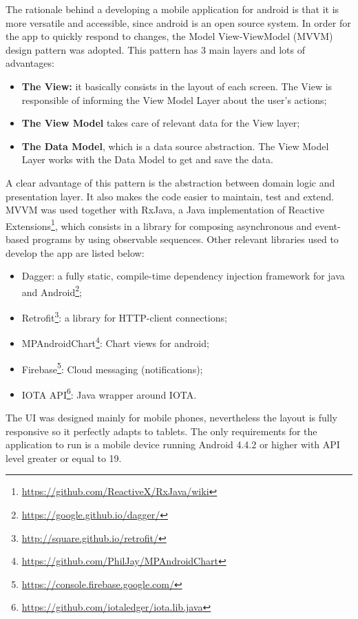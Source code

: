 The rationale behind a developing a mobile application for android is that it is  more versatile and accessible, since android is an open source system. In order for the app to quickly respond to changes, the Model View-ViewModel (MVVM) design pattern was adopted. This pattern has 3 main layers and lots of advantages:
\begin{itemize}
    \item \textbf{The View:} it basically consists in the layout of each screen. The View is responsible of informing the View Model Layer about the user’s actions;
    \item \textbf{The View Model} takes care of relevant data for the View layer;
    \item \textbf{The Data Model}, which is a data source abstraction. The View Model Layer works with the Data Model to get and save the data. 
\end{itemize}

A clear advantage of this pattern is the abstraction between domain logic and presentation layer. It also makes the code easier to maintain, test and extend. \ac{MVVM} was used together with RxJava, a Java implementation of Reactive Extensions\footnote{\url{https://github.com/ReactiveX/RxJava/wiki}}, which consists in a library for composing asynchronous and event-based programs by using observable sequences.
Other relevant libraries used to develop the app are listed below:
\begin{itemize}
    \item Dagger: a fully static, compile-time dependency injection framework for java and Android\footnote{\url{https://google.github.io/dagger/}};
    \item Retrofit\footnote{\url{http://square.github.io/retrofit/}}: a library for HTTP-client connections;
    \item MPAndroidChart\footnote{\url{https://github.com/PhilJay/MPAndroidChart}}: Chart views for android;
    \item Firebase\footnote{\url{https://console.firebase.google.com/}}: Cloud messaging (notifications);
    \item IOTA API\footnote{\url{ https://github.com/iotaledger/iota.lib.java}}: Java wrapper around IOTA.
\end{itemize}


The \ac{UI} was designed mainly for mobile phones, nevertheless the layout is fully responsive so it perfectly adapts to tablets. The only requirements for the application to run is a mobile device running Android 4.4.2 or higher with \ac{API} level greater or equal to 19. 


